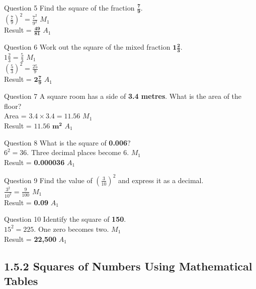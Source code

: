 \documentclass[12pt, a4paper, oneside]{article}
\begin{document}
\begin{solvingbox}{Question 5}
Find the square of the fraction $\mathbf{\frac{7}{9}}$. \\
$(\frac{7}{9})^2 = \frac{7^2}{9^2}$ \hfill $M_1$ \\
Result = $\mathbf{\frac{49}{81}}$ \hfill $A_1$
\end{solvingbox}

\begin{solvingbox}{Question 6}
Work out the square of the mixed fraction $\mathbf{1\frac{2}{3}}$. \\
$1\frac{2}{3} = \frac{5}{3}$ \hfill $M_1$ \\
$(\frac{5}{3})^2 = \frac{25}{9}$ \\
Result = $\mathbf{2\frac{7}{9}}$ \hfill $A_1$
\end{solvingbox}

\begin{solvingbox}{Question 7}
A square room has a side of \textbf{3.4 metres}. What is the area of the floor? \\
Area = $3.4 \times 3.4 = 11.56$ \hfill $M_1$ \\
Result = $\mathbf{11.56\text{ m}^2}$ \hfill $A_1$
\end{solvingbox}

\begin{solvingbox}{Question 8}
What is the square of \textbf{0.006}? \\
$6^2 = 36$. Three decimal places become 6. \hfill $M_1$ \\
Result = \textbf{0.000036} \hfill $A_1$
\end{solvingbox}

\begin{solvingbox}{Question 9}
Find the value of $(\frac{3}{10})^2$ and express it as a decimal. \\
$\frac{3^2}{10^2} = \frac{9}{100}$ \hfill $M_1$ \\
Result = \textbf{0.09} \hfill $A_1$
\end{solvingbox}

\begin{solvingbox}{Question 10}
Identify the square of \textbf{150}. \\
$15^2 = 225$. One zero becomes two. \hfill $M_1$ \\
Result = \textbf{22,500} \hfill $A_1$
\end{solvingbox}

\newpage

\subsection*{1.5.2 Squares of Numbers Using Mathematical Tables}
\end{document}
